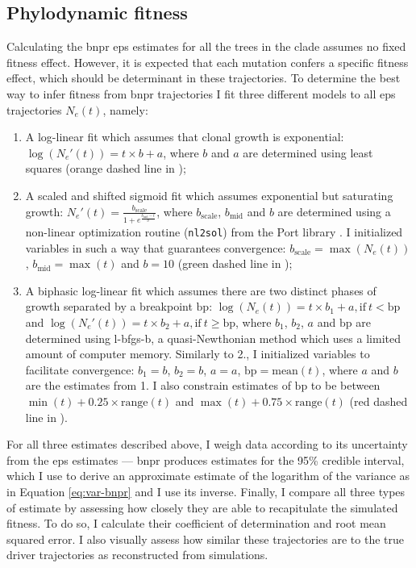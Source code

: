 \subsection{Phylodynamic fitness}

Calculating the \ac{bnpr} \ac{eps} estimates for all the trees in the clade assumes no fixed fitness effect. However, it is expected that each mutation confers a specific fitness effect, which should be determinant in these trajectories. To determine the best way to infer fitness from \ac{bnpr} trajectories I fit three different models to all \ac{eps} trajectories $N_e(t)$, namely:

\begin{enumerate}
    \item A log-linear fit which assumes that clonal growth is exponential: $\log(N_e'(t)) = t \times b + a$, where $b$ and $a$ are determined using least squares (orange dashed line in );
    \item A scaled and shifted sigmoid fit which assumes exponential but saturating growth: $N_e'(t) = \frac{b_{\mathrm{scale}}}{1+e^{\frac{b_{\mathrm{mid}}-t}{b}}}$, where $b_{\mathrm{scale}}$, $b_{\mathrm{mid}}$ and $b$ are determined using a non-linear optimization routine (\texttt{nl2sol}) from the Port library \cite{noauthor_undated-gs}. I initialized variables in such a way that guarantees convergence: $b_{\mathrm{scale}}=\max(N_e(t))$, $b_{\mathrm{mid}}=\max(t)$ and $b=10$ (green dashed line in );
    \item A biphasic log-linear fit which assumes there are two distinct phases of growth separated by a breakpoint $\mathrm{bp}$: $\log(N_e(t)) = t \times b_1 + a, \mathrm{if}\ t < \mathrm{bp}$ and $\log(N_e'(t)) = t \times b_2 + a, \mathrm{if}\ t \geq \mathrm{bp}$, where $b_1$, $b_2$, $a$ and $\mathrm{bp}$ are determined using \ac{l-bfgs-b}, a quasi-Newthonian method which uses a limited amount of computer memory. Similarly to 2., I initialized variables to facilitate convergence: $b_1=b$, $b_2=b$, $a=a$, $\mathrm{bp}=\mathrm{mean}(t)$, where $a$ and $b$ are the estimates from 1. I also constrain estimates of $\mathrm{bp}$ to be between $\min(t) + 0.25 \times \mathrm{range}(t)$ and $\max(t) + 0.75 \times \mathrm{range}(t)$ (red dashed line in ).
\end{enumerate}

For all three estimates described above, I weigh data according to its uncertainty from the \ac{eps} estimates --- \ac{bnpr} produces estimates for the 95\% credible interval, which I use to derive an approximate estimate of the logarithm of the variance as in Equation \eqref{eq:var-bnpr} and I use its inverse. Finally, I compare all three types of estimate by assessing how closely they are able to recapitulate the simulated fitness. To do so, I calculate their coefficient of determination and root mean squared error. I also visually assess how similar these trajectories are to the true driver trajectories as reconstructed from simulations.

